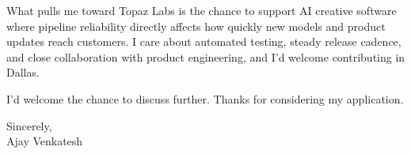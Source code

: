 \documentclass[letterpaper,11pt]{article}
\begin{document}
What pulls me toward Topaz Labs is the chance to support AI creative software where pipeline reliability directly affects how quickly new models and product updates reach customers. I care about automated testing, steady release cadence, and close collaboration with product engineering, and I'd welcome contributing in Dallas.

I'd welcome the chance to discuss further. Thanks for considering my application.

\vspace{12pt}
Sincerely, \\
Ajay Venkatesh
\end{document}
